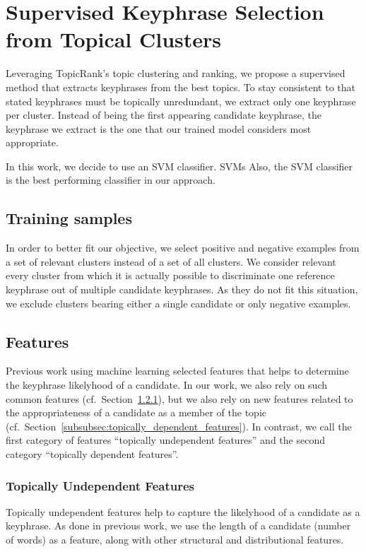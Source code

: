 \section{Supervised Keyphrase Selection\\from Topical Clusters}
\label{sec:supervised_keyphrase_selection_from_topical_clusters}
  Leveraging TopicRank's topic clustering and ranking, we propose a supervised
  method that extracts keyphrases from the best topics. To stay consistent to
   that stated keyphrases must be topically
  unredundant, we extract only one keyphrase per cluster. Instead of being the
  first appearing candidate keyphrase, the keyphrase we extract is the one that
  our trained model considers most appropriate.

  In this work, we decide to use an SVM classifier. SVMs \TODO{\dots} Also, the
  SVM classifier is the best performing classifier in our approach.

  \subsection{Training samples}
  \label{subsec:training_samples}
    In order to better fit our objective, we select positive and negative
    examples from a set of relevant clusters instead of a set of all clusters.
    We consider relevant every cluster from which it is actually possible to
    discriminate one reference keyphrase out of multiple candidate keyphrases.
    As they do not fit this situation, we exclude clusters bearing either a
    single candidate or only negative examples.

  \subsection{Features}
  \label{subsec:features}
    Previous work using machine learning selected features that helps to
    determine the keyphrase likelyhood of a candidate. In our work, we also rely
    on such common features
    (cf.~Section~\ref{subsubsec:topically_undependent_features}), but we also
    rely on new features related to the appropriateness of a candidate as a
    member of the topic
    (cf.~Section~\ref{subsubsec:topically_dependent_features}). In contrast, we
    call the first category of features ``topically undependent features'' and
    the second category ``topically dependent features''.

    \subsubsection{Topically Undependent Features}
    \label{subsubsec:topically_undependent_features}
      Topically undependent features help to capture the likelyhood of a
      candidate as a keyphrase. As done in previous work, we use the length of a
      candidate (number of words) as a feature, along with other structural and
      distributional features.

